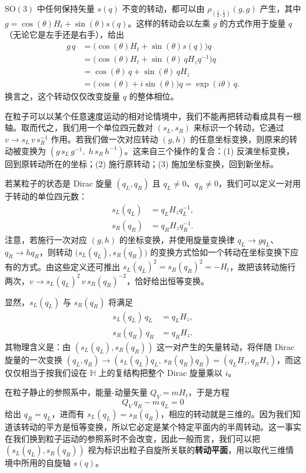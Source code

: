 $\mathrm{SO}(3)$ 中任何保持矢量 $s(q)$ 不变的转动，都可以由 $\rho_{(\tfrac12,\tfrac12)}(g,g)$ 产生，其中 $g=\cos(\theta)H_{t}+\sin(\theta)s(q)$。这样的转动会以左乘 $g$ 的方式作用于旋量 $q$（无论它是左手还是右手），给出
\begin{align*}
g\,q &= \bigl(\cos(\theta)H_{t}+\sin(\theta)s(q)\bigr)q\\
&= \bigl(\cos(\theta)H_{t}+\sin(\theta)\,qH_{z}q^{-1}\bigr)q\\
&= \cos(\theta)\,q+\sin(\theta)\,qH_{z}\\
&= \bigl(\cos(\theta)+i\sin(\theta)\bigr)q
= \exp(i\theta)\,q .
\end{align*}
换言之，这个转动仅仅改变旋量 $q$ 的整体相位。

在粒子可以以某个任意速度运动的相对论情境中，我们不能再把转动看成具有一根轴。取而代之，我们用一个单位四元数对 $(s_{L},s_{R})$ 来标识一个转动，它通过 $v\to s_{L}\,v\,s_{R}^{-1}$ 作用。若我们做一次对应转动 $(g,h)$ 的任意坐标变换，则原来的转动被变换为 $(g\,s_{L}\,g^{-1},\;h\,s_{R}\,h^{-1})$。这来自三个操作的复合：(1) 反演坐标变换，回到原转动所在的坐标；(2) 施行原转动；(3) 施加坐标变换，回到新坐标。

若某粒子的状态是 Dirac 旋量 $(q_{L},q_{R})$ 且 $q_{L}\neq0$、$q_{R}\neq0$，我们可以定义一对用于转动的单位四元数：
\begin{align}
s_{L}(q_{L}) &= q_{L}H_{z}q_{L}^{-1},\\
s_{R}(q_{R}) &= q_{R}H_{z}q_{R}^{-1}.
\end{align}
注意，若施行一次对应 $(g,h)$ 的坐标变换，并使用旋量变换律 $q_{L}\to gq_{L}$、$q_{R}\to hq_{R}$，则转动 $\bigl(s_{L}(q_{L}),s_{R}(q_{R})\bigr)$ 的变换方式恰如一个转动在坐标变换下应有的方式。由这些定义还可推出 $s_{L}(q_{L})^{2}=s_{R}(q_{R})^{2}=-H_{t}$，故把该转动施行两次，$v\to s_{L}(q_{L})^{2}\,v\,s_{R}(q_{R})^{-2}$，恰好给出恒等变换。

显然，$s_{L}(q_{L})$ 与 $s_{R}(q_{R})$ 将满足
\begin{align*}
s_{L}(q_{L})\,q_{L} &= q_{L}H_{z},\\
s_{R}(q_{R})\,q_{R} &= q_{R}H_{z}.
\end{align*}
其物理含义是：由 $(s_{L}(q_{L}),s_{R}(q_{R}))$ 这一对产生的矢量转动，将伴随 Dirac 旋量的一次变换 $(q_{L},q_{R})\to(s_{L}(q_{L})q_{L},\,s_{R}(q_{R})q_{R})=(q_{L}H_{z},q_{R}H_{z})$，而这仅仅相当于按我们设在 $\mathbb{H}$ 上的复结构把整个 Dirac 旋量乘以 $i$。

在粒子静止的参照系中，能量-动量矢量 $Q_{V}=mH_{t}$，于是方程
\begin{equation}
Q_{V}\,q_{R}-m\,q_{L}=0
\end{equation}
给出 $q_{R}=q_{L}$，进而有 $s_{L}(q_{L})=s_{R}(q_{R})$，相应的转动就是三维的。因为我们知道该转动的平方是恒等变换，所以它必定是某个特定平面内的半周转动。这一事实在我们换到粒子运动的参照系时不会改变，因此一般而言，我们可以把 $(s_{L}(q_{L}),s_{R}(q_{R}))$ 视为标识出粒子自旋所关联的\textbf{转动平面}，用以取代三维情境中所用的自旋轴 $s(q)$。

